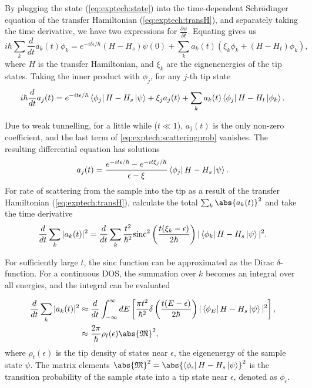 By plugging the state (\autoref{eq:exptech:state}) into the time-dependent Schr\"odinger equation of the transfer Hamiltonian (\autoref{eq:exptech:transH}), and separately taking the time derivative, we have two expressions for $\frac{\partial \psi}{\partial t}$. Equating gives us
\begin{equation}
i\hbar \sum_k \frac{d}{dt} a_k(t) \phi_k = e^{-it\epsilon / \hbar} (H-H_{s})\psi(0) + \sum_k a_k(t) (\xi_k \phi_k + (H-H_{t})\phi_k),
\end{equation}
where $H$ is the transfer Hamiltonian, and $\xi_k$ are the eignenenergies of the tip states. Taking the inner product with $\phi_j$, for any $j$-th tip state
\begin{equation} \label{eq:exptech:scatteringprob}
i\hbar \frac{d}{dt} a_j(t) = e^{-it\epsilon/\hbar} \Bra{\phi_j}H-H_{s} \Ket{\psi} + \xi_j a_j(t) + \sum_k a_k(t) \Bra{\phi_j} H - H_{t} \Ket{\phi_k}.
\end{equation}

Due to weak tunnelling, for a little while ($t \ll 1$), $a_j(t)$ is the only non-zero coefficient, and the last term of \autoref{eq:exptech:scatteringprob} vanishes. The resulting differential equation has solutions
\begin{equation}
a_j(t) =  \frac{e^{-it\epsilon/\hbar} - e^{-it\xi_j/\hbar}}{\epsilon - \xi}  \Bra{\phi_j} H-H_{s} \Ket{\psi}.
\end{equation}
For rate of scattering from the sample into the tip as a result of the transfer Hamiltonian (\autoref{eq:exptech:transH}), calculate the total $\sum_k \abs{a_k(t)}^2$ and take the time derivative
\begin{equation}
\frac{d}{dt}\sum_k |a_k(t)|^2 = \frac{d}{dt}  \sum_k \frac{t^2}{\hbar^2}\textrm{sinc}^2 \left(\frac{t(\xi_k - \epsilon)}{2\hbar} \right) | \Bra{\phi_k} H-H_{s} \Ket{\psi}  | ^2.
\end{equation}

For sufficiently large $t$, the sinc function can be approximated as the Dirac $\delta$-function. For a continuous \ac{DOS}, the summation over $k$ becomes an integral over all energies, and the integral can be evaluated

\begin{align}
\frac{d}{dt}\sum_k |a_k(t)|^2 &\approx  \frac{d}{dt}  \int_{-\infty}^\infty dE \left[ \frac{\pi t^2}{\hbar^2} \delta \left(\frac{t(E - \epsilon)}{2\hbar} \right) | \Bra{\phi_E} H-H_{s} \Ket{\psi}  | ^2 \right], \\
&\approx  \frac{2\pi }{\hbar} \rho_t(\epsilon) \abs{\mathfrak{M}}^2,
\end{align}
where $\rho_t(\epsilon)$ is the tip density of states near $\epsilon$, the eigenenergy of the sample state $\psi$. The matrix elements $\abs{\mathfrak{M}}^2 = \abs{\Bra{\phi_\epsilon} H - H_s \Ket{\psi}}^2$ is the transition probability of the sample state into a tip state near $\epsilon$, denoted as $\phi_\epsilon$.

